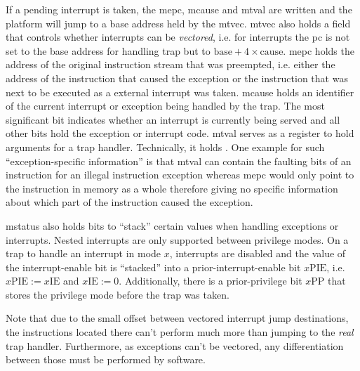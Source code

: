 If a pending interrupt is taken, the \gls{mepc}, \gls{mcause} and \gls{mtval} are written and the platform will jump to a base address held by the \gls{mtvec}.
\gls{mtvec} also holds a field that controls whether interrupts can be \textit{vectored}, i.e. for interrupts the \gls{pc} is not set to the base address for handling trap but to $ \text{base} + 4 \times \text{cause} $.
\gls{mepc} holds the address of the original instruction stream that was preempted, i.e. either the address of the instruction that caused the exception or the instruction that was next to be executed as a external interrupt was taken.
\gls{mcause} holds an identifier of the current interrupt or exception being handled by the trap.
The most significant bit indicates whether an interrupt is currently being served and all other bits hold the exception or interrupt code.
\gls{mtval} serves as a register to hold arguments for a trap handler.
Technically, it holds .
One example for such \enquote{exception-specific information} is that \gls{mtval} can contain the faulting bits of an instruction for an illegal instruction exception whereas \gls{mepc} would only point to the instruction in memory as a whole therefore giving no specific information about which part of the instruction caused the exception.

\gls{mstatus} also holds bits to \enquote{stack} certain values when handling exceptions or interrupts.
Nested interrupts are only supported between privilege modes.
On a trap to handle an interrupt in mode $ x $, interrupts are disabled and the value of the interrupt-enable bit is \enquote{stacked} into a prior-interrupt-enable bit $x\text{PIE} $, i.e. $ x\text{PIE} := x\text{IE} $ and $ x\text{IE} := 0 $.
Additionally, there is a prior-privilege bit $ x\text{PP} $ that stores the privilege mode before the trap was taken.

Note that due to the small offset between vectored interrupt jump destinations, the instructions located there can't perform much more than jumping to the \textit{real} trap handler.
Furthermore, as exceptions can't be vectored, any differentiation between those must be performed by software.

